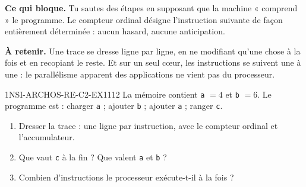 

\textbf{Ce qui bloque.} Tu sautes des étapes en supposant que la machine « comprend » le
programme. Le compteur ordinal désigne l'instruction suivante de façon entièrement
déterminée : aucun hasard, aucune anticipation.

\textbf{À retenir.} Une trace se dresse ligne par ligne, en ne modifiant qu'une chose à la fois
et en recopiant le reste. Et sur un seul cœur, les instructions se suivent une à une : le
parallélisme apparent des applications ne vient pas du processeur.

\begin{exercice}{1NSI-ARCHOS-RE-C2-EX1}{1}{12}
La mémoire contient \lstinline{a} $= 4$ et \lstinline{b} $= 6$. Le programme est :
charger \lstinline{a} ; ajouter \lstinline{b} ; ajouter \lstinline{a} ; ranger \lstinline{c}.
\begin{enumerate}
  \item Dresser la trace : une ligne par instruction, avec le compteur ordinal et
        l'accumulateur.
  \item Que vaut \lstinline{c} à la fin ? Que valent \lstinline{a} et \lstinline{b} ?
  \item Combien d'instructions le processeur exécute-t-il à la fois ?
\end{enumerate}
\end{exercice}

